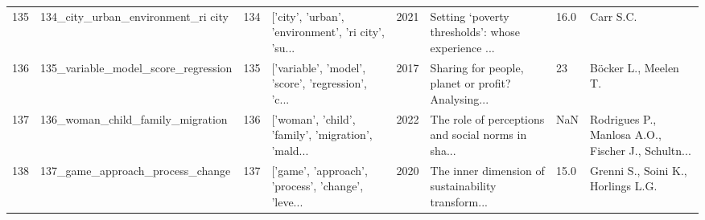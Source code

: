 \begin{tabular}{rlrlrlll}
        135 &                 134\_city\_urban\_environment\_ri city &       134 & ['city', 'urban', 'environment', 'ri city', 'su... &          2021 & Setting ‘poverty thresholds’: whose experience ... &    16.0 &                                          Carr S.C. \\
        136 &                135\_variable\_model\_score\_regression &       135 & ['variable', 'model', 'score', 'regression', 'c... &          2017 & Sharing for people, planet or profit? Analysing... &      23 &                               Böcker L., Meelen T. \\
        137 &                   136\_woman\_child\_family\_migration &       136 & ['woman', 'child', 'family', 'migration', 'mald... &          2022 & The role of perceptions and social norms in sha... &     NaN & Rodrigues P., Manlosa A.O., Fischer J., Schultn... \\
        138 &                   137\_game\_approach\_process\_change &       137 & ['game', 'approach', 'process', 'change', 'leve... &          2020 & The inner dimension of sustainability transform... &    15.0 &                 Grenni S., Soini K., Horlings L.G. \\
\bottomrule
\end{tabular}

